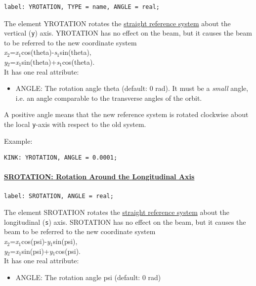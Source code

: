 \begin{verbatim}
label: YROTATION, TYPE = name, ANGLE = real;
\end{verbatim} 

The element YROTATION rotates the
\href{local_system.html#straight}{straight reference system} about the
vertical (\texttt{y}) axis. YROTATION has no effect on the beam, but it
causes the beam to be referred to the new coordinate system  \\
\textit{x}$_2$=\textit{x}$_1$cos(theta)-\textit{s}$_1$sin(theta), \\
\textit{y}$_2$=\textit{x}$_1$sin(theta)+\textit{s}$_1$cos(theta).\\

It has one real attribute: 
\begin{itemize}
   \item ANGLE: The rotation angle theta (default: 0 rad). It must be a
     \emph{small} angle, i.e. an angle comparable to the transverse
     angles of the orbit. 
\end{itemize} 

A positive angle means that the new reference system is rotated
clockwise about the local \texttt{y}-axis with respect to the old system. 

Example: 
\begin{verbatim}
KINK: YROTATION, ANGLE = 0.0001;
\end{verbatim}

\paragraph{\href{srotation}{SROTATION: Rotation Around the Longitudinal Axis}}

\begin{verbatim}
label: SROTATION, ANGLE = real;
\end{verbatim} 

The element SROTATION rotates the
\href{local_system.html#straight}{straight reference system} about the
longitudinal (\texttt{s}) axis. SROTATION has no effect on the beam, but
it causes the beam to be referred to the new coordinate system \\
\textit{x}$_2$=\textit{x}$_1$cos(psi)-\textit{y}$_1$sin(psi),\\
\textit{y}$_2$=\textit{x}$_1$sin(psi)+\textit{y}$_1$cos(psi).\\ 

It has one real attribute: 
\begin{itemize}
   \item ANGLE: The rotation angle psi (default: 0 rad) 
\end{itemize} 

